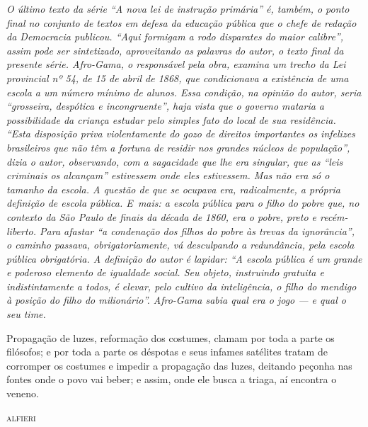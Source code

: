 \begin{didascalia}\itshape
O último texto da série ``A nova lei de instrução primária'' é,
também, o ponto final no conjunto de textos em defesa da educação
pública que o chefe de redação da \textnormal{Democracia} publicou. ``Aqui
formigam a rodo disparates do maior calibre'', assim pode ser
sintetizado, aproveitando as palavras do autor, o texto final da
presente série. Afro-Gama, o responsável pela obra, examina um
trecho da Lei provincial nº 54, de 15 de abril de 1868, que condicionava a
existência de uma escola a um número mínimo de alunos. Essa condição, na
opinião do autor, seria ``grosseira, despótica e incongruente'', haja
vista que o governo mataria a possibilidade da criança estudar pelo
simples fato do local de sua residência. ``Esta disposição priva
violentamente do gozo de direitos importantes os infelizes brasileiros
que não têm a fortuna de residir nos grandes núcleos de população'',
dizia o autor, observando, com a sagacidade que lhe era singular, que as
``leis criminais os alcançam'' estivessem onde eles estivessem. Mas não
era só o tamanho da escola. A questão de que se ocupava era,
radicalmente, a própria definição de escola pública. E~mais: a escola
pública para o filho do pobre que, no contexto da São Paulo de finais da
década de 1860, era o pobre, preto e recém-liberto. Para afastar ``a
condenação dos filhos do pobre às trevas da ignorância'', o caminho
passava, obrigatoriamente, vá desculpando a redundância, pela escola
pública obrigatória. A definição do autor é lapidar: ``A escola pública é
um grande e poderoso elemento de igualdade social. Seu objeto,
instruindo gratuita e indistintamente a todos, é elevar, pelo cultivo da
inteligência, o filho do mendigo à posição do filho do milionário''.
Afro-Gama sabia qual era o jogo --- e qual o seu time.
\end{didascalia}



\epigraph{Propagação de luzes, reformação dos costumes, clamam por toda a parte os
filósofos; e por toda a parte os déspotas e seus infames satélites
tratam de corromper os costumes e impedir a propagação das luzes,
deitando peçonha nas fontes onde o povo vai beber; e assim, onde ele
busca a triaga,\footnotemark{} aí encontra o veneno.}{\textsc{alfieri}\footnotemark}



